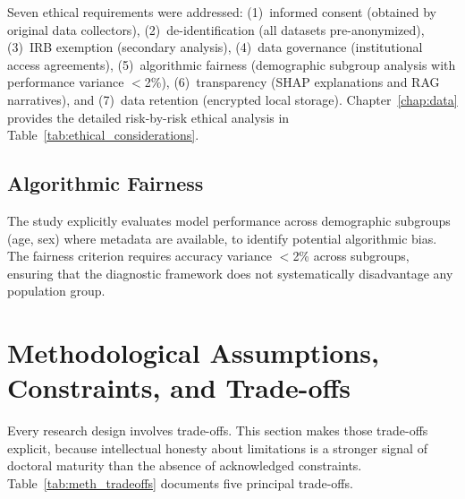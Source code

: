 Seven ethical requirements were addressed: (1)~informed consent (obtained by original data collectors), (2)~de-identification (all datasets pre-anonymized), (3)~IRB exemption (secondary analysis), (4)~data governance (institutional access agreements), (5)~algorithmic fairness (demographic subgroup analysis with performance variance $<$2\%), (6)~transparency (SHAP explanations and RAG narratives), and (7)~data retention (encrypted local storage). Chapter~\ref{chap:data} provides the detailed risk-by-risk ethical analysis in Table~\ref{tab:ethical_considerations}.

\subsection{Algorithmic Fairness}

The study explicitly evaluates model performance across demographic subgroups (age, sex) where metadata are available, to identify potential algorithmic bias. The fairness criterion requires accuracy variance $<$2\% across subgroups, ensuring that the diagnostic framework does not systematically disadvantage any population group.

\section{Methodological Assumptions, Constraints, and Trade-offs}
\label{sec:meth_assumptions}

Every research design involves trade-offs. This section makes those trade-offs explicit, because intellectual honesty about limitations is a stronger signal of doctoral maturity than the absence of acknowledged constraints. Table~\ref{tab:meth_tradeoffs} documents five principal trade-offs.

